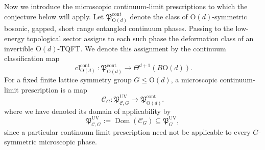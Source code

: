 \documentclass[aps,prx,reprint,superscriptaddress,twocolumn,amsmath,amssymb,amsfonts, nofootinbib]{revtex4-2}
\theoremstyle{apsstyle}
\begin{document}
Now we introduce the microscopic continuum-limit prescriptions to
which the conjecture below will apply. Let $\mathfrak P_{\mathrm{O}(d)}^{\mathrm{cont}}$ denote the class of $\mathrm{O}(d)$-symmetric bosonic, gapped, short range entangled continuum phases. Passing to the low-energy topological sector assigns to each such phase the deformation class of an invertible $\mathrm{O}(d)$-TQFT. We denote this assignment by the continuum classification map
\begin{equation}
\operatorname{cl}^{\mathrm{cont}}_{\mathrm{O}(d)}:
\mathfrak P_{\mathrm{O}(d)}^{\mathrm{cont}}
\longrightarrow
\Theta^{d+1}(B\mathrm{O}(d)).
\label{eq:continuum_phase_classification}
\end{equation}
For a fixed finite lattice symmetry
group $G\leq\mathrm O(d)$, a microscopic continuum-limit prescription
is a map
\begin{equation}
\mathcal C_G:
\mathfrak P_{\mathcal C,G}^{\mathrm{UV}}
\longrightarrow
\mathfrak P_{\mathrm O(d)}^{\mathrm{cont}}.
\label{eq:microscopic_CL}
\end{equation}
where we have denoted its domain of
applicability by
\begin{equation*}
\mathfrak P_{\mathcal C,G}^{\mathrm{UV}}
:=
\operatorname{Dom}(\mathcal C_G)
\subseteq
\mathfrak P_G^{\mathrm{UV}},
\end{equation*} since a particular continuum limit prescription need not be applicable to every
$G$-symmetric microscopic phase.
\end{document}
